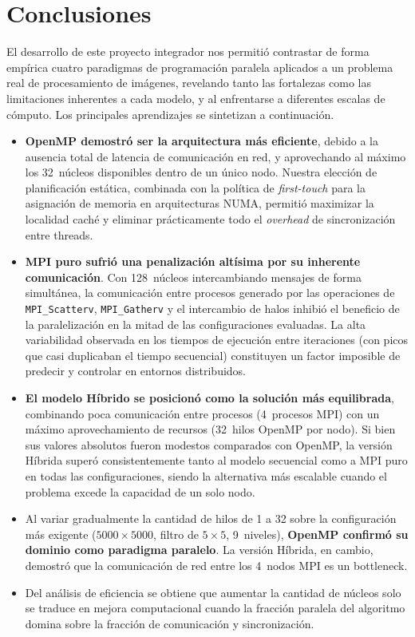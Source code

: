 \chapter{Conclusiones}

El desarrollo de este proyecto integrador nos permitió contrastar de forma empírica cuatro paradigmas de programación paralela aplicados a un problema real de procesamiento de imágenes, revelando tanto las fortalezas como las limitaciones inherentes a cada modelo, y al enfrentarse a diferentes escalas de cómputo. Los principales aprendizajes se sintetizan a continuación.

\begin{itemize}
    \item \textbf{OpenMP demostró ser la arquitectura más eficiente}, debido a la ausencia total de latencia de comunicación en red, y aprovechando al máximo los 32~núcleos disponibles dentro de un único nodo. Nuestra elección de planificación estática, combinada con la política de \textit{first-touch} para la asignación de memoria en arquitecturas NUMA, permitió maximizar la localidad caché y eliminar prácticamente todo el \textit{overhead} de sincronización entre threads.
    \item \textbf{MPI puro sufrió una penalización altísima por su inherente comunicación}. Con 128~núcleos intercambiando mensajes de forma simultánea, la comunicación entre procesos generado por las operaciones de \texttt{MPI\_Scatterv}, \texttt{MPI\_Gatherv} y el intercambio de halos inhibió el beneficio de la paralelización en la mitad de las configuraciones evaluadas. La alta variabilidad observada en los tiempos de ejecución entre iteraciones (con picos que casi duplicaban el tiempo secuencial) constituyen un factor imposible de predecir y controlar en entornos distribuidos.
    \item \textbf{El modelo Híbrido se posicionó como la solución más equilibrada}, combinando poca comunicación entre procesos (4~procesos MPI) con un máximo aprovechamiento de recursos (32~hilos OpenMP por nodo). Si bien sus valores absolutos fueron modestos comparados con OpenMP, la versión Híbrida superó consistentemente tanto al modelo secuencial como a MPI puro en todas las configuraciones, siendo la alternativa más escalable cuando el problema excede la capacidad de un solo nodo.
    \item Al variar gradualmente la cantidad de hilos de 1 a 32 sobre la configuración más exigente ($5000 \times 5000$, filtro de $5 \times 5$, 9~niveles), \textbf{OpenMP confirmó su dominio como paradigma paralelo}. La versión Híbrida, en cambio, demostró que la comunicación de red entre los 4~nodos MPI es un bottleneck.
    \item Del análisis de eficiencia se obtiene que aumentar la cantidad de núcleos solo se traduce en mejora computacional cuando la fracción paralela del algoritmo domina sobre la fracción de comunicación y sincronización.
\end{itemize}

